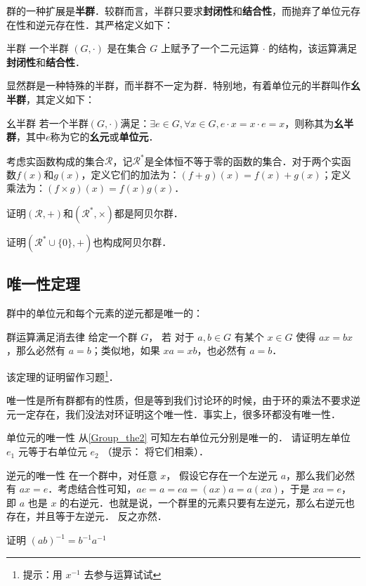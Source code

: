 群的一种扩展是\textbf{半群}．较群而言，半群只要求\textbf{封闭性}和\textbf{结合性}，而抛弃了单位元存在性和逆元存在性．其严格定义如下：

\begin{definition}{半群}
一个半群 $(G, \cdot)$ 是在集合 $G$ 上赋予了一个二元运算 $\cdot$ 的结构，该运算满足\textbf{封闭性}和\textbf{结合性}．
\end{definition}

显然群是一种特殊的半群，而半群不一定为群．特别地，有着单位元的半群叫作\textbf{幺半群}，其定义如下：

\begin{definition}{幺半群}
若一个半群$(G,\cdot )$满足：$\exists e\in G,\forall x\in G,e\cdot x=x\cdot e=x$，则称其为\textbf{幺半群}，其中$e$称为它的\textbf{幺元}或\textbf{单位元}．
\end{definition}

\begin{exercise}{}
考虑实函数构成的集合$\mathcal{R}$，记$\mathcal{R}^*$是全体恒不等于零的函数的集合．对于两个实函数$f(x)$和$g(x)$，定义它们的加法为：$(f+g)(x)=f(x)+g(x)$；定义乘法为：$(f\times g)(x)=f(x) g(x)$．

证明$(\mathcal{R}, +)$和$(\mathcal{R}^*, \times)$都是阿贝尔群．

证明$(\mathcal{R}^*\cup \{0\}, +)$也构成阿贝尔群．
\end{exercise}






\subsection{唯一性定理}

群中的单位元和每个元素的逆元都是唯一的：

\begin{theorem}{群运算满足消去律}\label{Group_the2}
给定一个群 $G$， 若 对于 $ a, b\in G$ 有某个 $x\in G$ 使得 $ax=bx$，那么必然有 $a=b$；类似地，如果 $xa=xb$，也必然有 $a=b$．
\end{theorem}

该定理的证明留作习题\footnote{提示：用 $x^{-1}$ 去参与运算试试}．

唯一性是所有群都有的性质，但是等到我们讨论环的时候，由于环的乘法不要求逆元一定存在，我们没法对环证明这个唯一性．事实上，很多环都没有唯一性．

\begin{exercise}{单位元的唯一性}
从\autoref{Group_the2} 可知左右单位元分别是唯一的． 请证明左单位 $e_1$ 元等于右单位元 $e_2$ （提示： 将它们相乘）．
\end{exercise}

\begin{theorem}{逆元的唯一性}\label{Group_the1}
在一个群中，对任意 $x$， 假设它存在一个左逆元 $a$，那么我们必然有 $ax=e$．考虑结合性可知，$ae=a=ea=(ax)a=a(xa)$，于是 $xa=e$，即 $a$ 也是 $x$ 的右逆元．也就是说，一个群里的元素只要有左逆元，那么右逆元也存在，并且等于左逆元． 反之亦然．
\end{theorem}

\begin{exercise}{}
证明 $(ab)^{-1} = b^{-1}a^{-1}$
\end{exercise}
